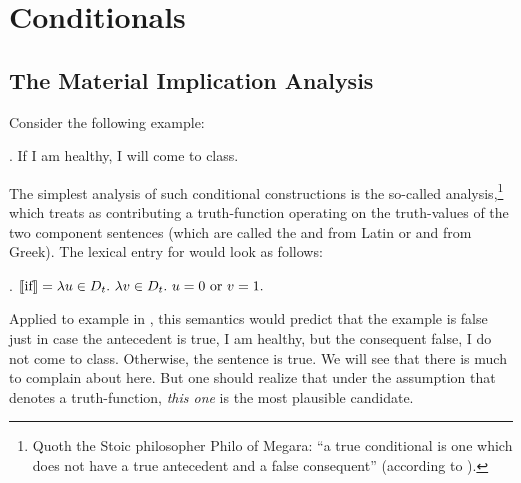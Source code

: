 \chapter{Conditionals}\label{cha:conditionals} %


\minitoc

\section{The Material Implication Analysis}

Consider the following example:

\ex. If I am healthy, I will come to class.

The simplest analysis of such conditional constructions is the so-called  analysis,\footnote{Quoth the Stoic philosopher Philo of Megara: ``a true conditional is one which does not have a true antecedent and a false consequent'' (according to \citet[II, 110--112]{sextus-empiricus:200:outlines}).} which treats  as contributing a truth-function operating on the truth-values of the two component sentences (which are called the  and  \dash from Latin \dash or  and  \dash from Greek). The lexical entry for  would look as follows:

\ex.\label{ex:material} $\llbracket \mbox{if} \rrbracket = \lambda u \in D_t.\ \lambda v \in D_t.\ u=0 \mbox{ or } v=1.$

Applied to example in \LLast, this semantics would predict that the example is false just in case the antecedent is true, I am healthy, but the consequent false, I do not come to class. Otherwise, the sentence is true. We will see that there is much to complain about here. But one should realize that under the assumption that  denotes a truth-function, \emph{this one} is the most plausible candidate.

